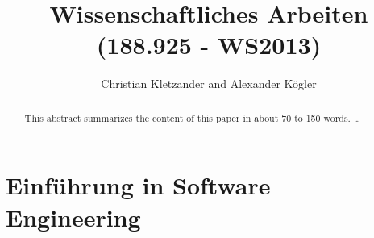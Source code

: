 \documentclass{llncs}
\begin{document}
\pagestyle{plain}

\title{Wissenschaftliches Arbeiten (188.925 - WS2013)}


\author{Christian Kletzander and Alexander Kögler}


\maketitle

\begin{abstract}
This abstract summarizes the content of this paper in about 70 to 150 words. \dots
\end{abstract}

\tableofcontents
\newpage


\section{Einführung in Software Engineering}
\end{document}
